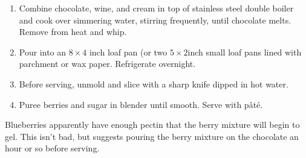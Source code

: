 
\begin{ingredients}
\end{ingredients}


\begin{recipe}
  \begin{enumerate}

  \item Combine chocolate, wine, and cream in top  of stainless steel
    double boiler and cook over simmering water, stirring frequently,
    until chocolate melts.  Remove from heat and whip.

  \item Pour into an $8\times 4$ inch loaf pan (or two $5\times
    2$\fracH inch small loaf pans lined with parchment or wax paper.
    Refrigerate overnight.

  \item Before serving, unmold and slice with a sharp knife dipped in
    hot water.

  \item Puree berries and sugar in blender until smooth.  Serve with p\^at\'e.

  \end{enumerate}

Blueberries apparently have enough pectin that the berry mixture will
begin to gel.  This isn't bad, but suggests pouring the berry mixture
on the chocolate an hour or so before serving.

\end{recipe}
